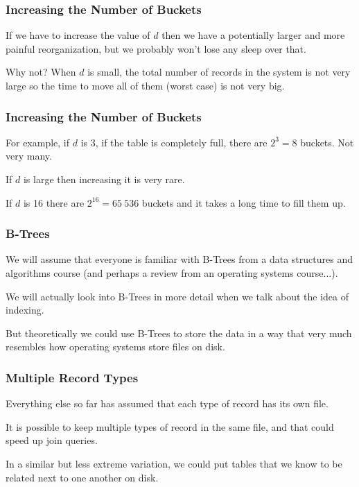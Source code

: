 \begin{frame}
\frametitle{Increasing the Number of Buckets}
If we have to increase the value of $d$ then we have a potentially larger and more painful reorganization, but we probably won't lose any sleep over that. 

Why not? When $d$ is small, the total number of records in the system is not very large so the time to move all of them (worst case) is not very big. 


\end{frame}



\begin{frame}
\frametitle{Increasing the Number of Buckets}

For example, if $d$ is 3, if the table is completely full, there are $2^{3} = 8$ buckets. Not very many. 

If $d$ is large then increasing it is very rare. 

If $d$ is 16 there are $2^{16} = 65~536$ buckets and it takes a long time to fill them up.

\end{frame}




\begin{frame}
\frametitle{B-Trees}

We will assume that everyone is familiar with B-Trees from a data structures and algorithms course (and perhaps a review from an operating systems course...). 

We will actually look into B-Trees in more detail when we talk about the idea of indexing. 

But theoretically we could use B-Trees to store the data in a way that very much resembles how operating systems store files on disk.

\end{frame}



\begin{frame}
\frametitle{Multiple Record Types}

Everything else so far has assumed that each type of record has its own file.

It is possible to keep multiple types of record in the same file, and that could speed up join queries.

In a similar but less extreme variation, we could put tables that we know to be related next to one another on disk.

\end{frame}






